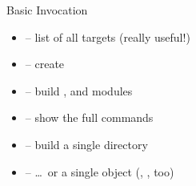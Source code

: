 \begin{frame}[fragile]{Basic Invocation}

  \begin{itemize}[<+->]
    \item {} -- list of all targets (really useful!)
    \item {} -- create 
    \item {} -- build ,  and modules
    \item {} -- show the full commands

    \item {} -- build a single directory
    \item {} -- \ldots\ or a single object (,
      ,  too)
  \end{itemize}

\end{frame}
